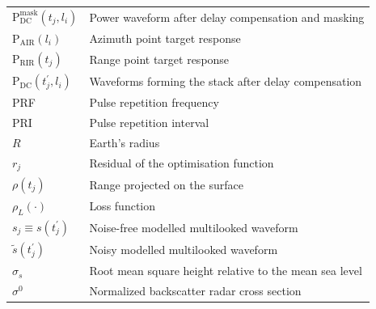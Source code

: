 \documentclass[11pt,a4paper]{article}
\begin{document}
\begin{table}[ht!]
\begin{tabular}{m{}m{}}
$\text{P}_\text{DC}^\text{mask}(t_j, l_i)$ & Power waveform after delay compensation and masking \\

$\text{P}_\text{AIR}(l_i)$ & Azimuth point target response \\

$\text{P}_\text{RIR}(t_j)$ & Range point target response \\

$\text{P}_\text{DC}(t_j^\prime, l_i)$ & Waveforms forming the stack after delay compensation \\

PRF & Pulse repetition frequency\\

PRI & Pulse repetition interval\\

$R$ & Earth's radius \\

$r_j$ & Residual of the optimisation function \\ 

$\rho(t_j)$ & Range projected on the surface \\

$\rho_L(\cdot)$ & Loss function \\

$s_j \equiv s(t^\prime_j)$ & Noise-free modelled multilooked waveform \\

$\tilde{s}(t^\prime_j)$ & Noisy modelled multilooked waveform \\

$\sigma_s$ & Root mean square height relative to the mean sea level \\

$\sigma^0$ & Normalized backscatter radar cross section \\ 

\end{tabular}
\end{table}

\newpage
\clearpage
\end{document}
